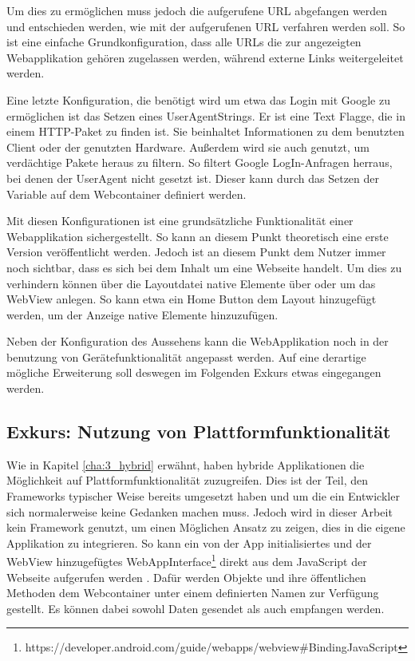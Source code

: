 Um dies zu ermöglichen muss jedoch die aufgerufene URL abgefangen werden und entschieden werden, wie mit der aufgerufenen URL verfahren werden soll. So ist eine einfache Grundkonfiguration, dass alle URLs die zur angezeigten Webapplikation gehören zugelassen werden, während externe Links weitergeleitet werden.

Eine letzte Konfiguration, die benötigt wird um etwa das Login mit Google zu ermöglichen ist das Setzen eines UserAgentStrings. Er ist eine Text Flagge, die in einem HTTP-Paket zu finden ist. Sie beinhaltet Informationen zu dem benutzten Client oder der genutzten Hardware. Außerdem wird sie auch genutzt, um verdächtige Pakete heraus zu filtern\cite{UserAgentString}. So filtert Google LogIn-Anfragen herraus, bei denen der UserAgent nicht gesetzt ist. Dieser kann durch das Setzen der Variable auf dem Webcontainer definiert werden.

Mit diesen Konfigurationen ist eine grundsätzliche Funktionalität einer Webapplikation sichergestellt. So kann an diesem Punkt theoretisch eine erste Version veröffentlicht werden. Jedoch ist an diesem Punkt dem Nutzer immer noch sichtbar, dass es sich bei dem Inhalt um eine Webseite handelt. Um dies zu verhindern können über die Layoutdatei native Elemente über oder um das WebView anlegen. So kann etwa ein Home Button dem Layout hinzugefügt werden, um der Anzeige native Elemente hinzuzufügen.

Neben der Konfiguration des Aussehens kann die WebApplikation noch in der benutzung von Gerätefunktionalität angepasst werden. Auf eine derartige mögliche Erweiterung soll deswegen im Folgenden Exkurs etwas eingegangen werden.

\subsection{Exkurs: Nutzung von Plattformfunktionalität}
Wie in Kapitel \ref{cha:3_hybrid} erwähnt, haben hybride Applikationen die Möglichkeit auf Plattformfunktionalität zuzugreifen. Dies ist der Teil, den Frameworks typischer Weise bereits umgesetzt haben und um die ein Entwickler sich normalerweise keine Gedanken machen muss. Jedoch wird in dieser Arbeit kein Framework genutzt, um einen Möglichen Ansatz zu zeigen, dies in die eigene Applikation zu integrieren. So kann ein von der App initialisiertes und der WebView hinzugefügtes WebAppInterface\footnote{https://developer.android.com/guide/webapps/webview\#BindingJavaScript} direkt aus dem JavaScript der Webseite aufgerufen werden \cite{webview_javascript_security}. Dafür werden Objekte und ihre öffentlichen Methoden dem Webcontainer unter einem definierten Namen zur Verfügung gestellt. Es können dabei sowohl Daten gesendet als auch empfangen werden.

